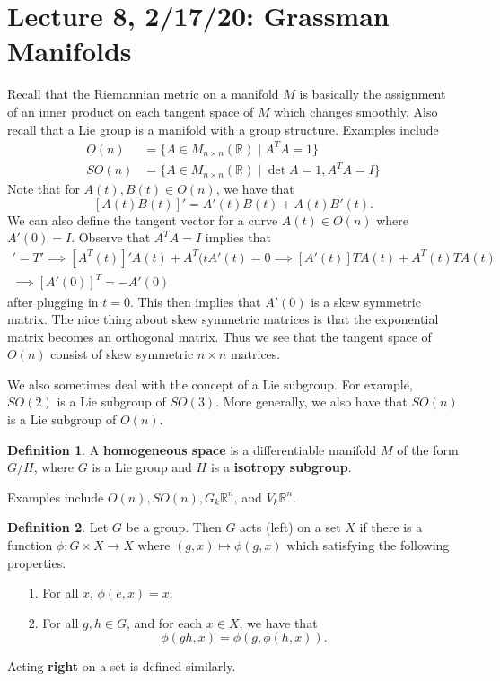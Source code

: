 \documentclass[12pt,letterpaper,boxed]{maths_v5}
\newcommand{\rr}{\mathbb{R}}
\theoremstyle{definition}
\newtheorem{definition}{Definition}[section]
\begin{document}
\section*{Lecture 8, 2/17/20: Grassman Manifolds}
Recall that the Riemannian metric on a manifold $M$ is basically 
the assignment of an inner product on each tangent space of $M$ which changes 
smoothly. Also recall that a Lie group is a manifold with a group structure. 
Examples include 
\begin{align*}
    O(n) &= \{A \in M_{n\times n}(\rr) \mid A^TA = 1\}\\
    SO(n) &= \{A \in M_{n\times n}(\rr) \mid \det A = 1, A^TA = I\} 
\end{align*}
Note that for $A(t), B(t)\in O(n)$, we have that 
\[
    [A(t)B(t)]' = A'(t)B(t) + A(t)B'(t).
\]
We can also define the tangent vector for a curve $A(t) \in O(n)$
where $A'(0) = I$. Observe that $A^TA = I$ implies that 
\begin{align*}
    [A^TA]' = T' \implies [A^T(t)]'A(t) + A^T(tA'(t) = 0
    \implies [A'(t)]TA(t) + A^T(t)TA(t)\\
    \implies [A'(0)]^T = -A'(0)
\end{align*}
after plugging in $t = 0$. This then implies that $A'(0)$ is a skew symmetric 
matrix. The nice thing about skew symmetric matrices is that the exponential matrix 
becomes an orthogonal matrix. Thus we see that the tangent space of $O(n)$ consist of 
skew symmetric $n\times n$ matrices. 

We also sometimes deal with the concept of a Lie subgroup. For example, 
$SO(2)$ is a Lie subgroup of $SO(3)$. More generally, we also have that 
$SO(n)$ is a Lie subgroup of $O(n)$. 

\begin{definition}
    A \textbf{homogeneous space} is a differentiable manifold $M$ of the form $G/H$, where 
    $G$ is a Lie group and $H$ is a \textbf{isotropy subgroup}.
\end{definition}
Examples include $O(n), SO(n), G_k\rr^n$, and $V_k\rr^n$. 

\begin{definition}
    Let $G$ be a group. Then $G$ acts (left) on a set $X$ if there is a function 
    $\phi: G\times X \to X$ where $(g,x) \mapsto \phi(g, x)$ which satisfying the following 
    properties. 
    \begin{itemize}
        \item[1.] For all $x$, $\phi(e, x) = x$. 
        \item[2.] For all $g, h \in G$, and for each $x \in X$, we have that 
        \[
            \phi(gh, x) = \phi(g, \phi(h,x)).
        \]
    \end{itemize}
    Acting \textbf{right} on a set is defined similarly. 
\end{definition}
\end{document}
